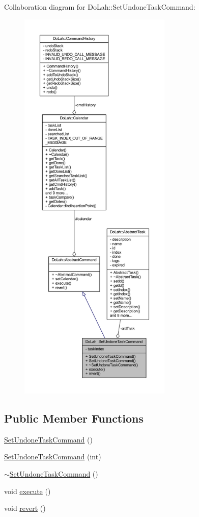 Collaboration diagram for Do\+Lah\+:\+:Set\+Undone\+Task\+Command\+:\nopagebreak
\begin{figure}[H]
\begin{center}
\leavevmode
\includegraphics[height=550pt]{class_do_lah_1_1_set_undone_task_command__coll__graph}
\end{center}
\end{figure}
\subsection*{Public Member Functions}
\begin{DoxyCompactItemize}
\item 
\hyperlink{class_do_lah_1_1_set_undone_task_command_afdc275ab0a51d5d1fd59e5138270298c}{Set\+Undone\+Task\+Command} ()
\item 
\hyperlink{class_do_lah_1_1_set_undone_task_command_a38cd9be0a3f9deac9b5f57858176c0cf}{Set\+Undone\+Task\+Command} (int)
\item 
\hyperlink{class_do_lah_1_1_set_undone_task_command_aad340203a0e74b4650c674d312c498db}{$\sim$\+Set\+Undone\+Task\+Command} ()
\item 
void \hyperlink{class_do_lah_1_1_set_undone_task_command_a0c23852210bd370f40d96a699ef69780}{execute} ()
\item 
void \hyperlink{class_do_lah_1_1_set_undone_task_command_afcd217bd18dbdff5bf0b135aec1713ad}{revert} ()
\end{DoxyCompactItemize}
